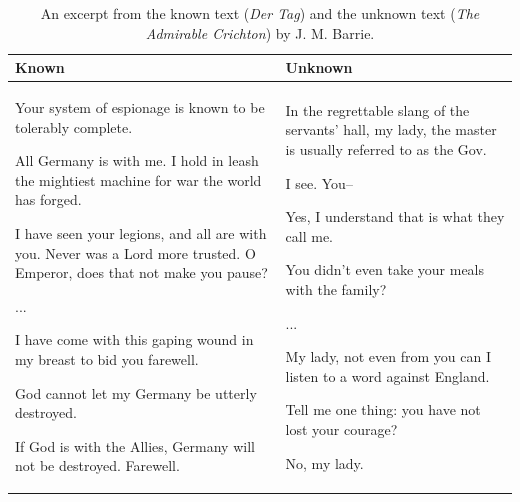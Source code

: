 \begin{table}[ht]
\fontsize{9}{11}\selectfont
\caption{\label{tab:barrietexts} An excerpt from the known text (\textit{Der Tag}) and the unknown text (\textit{The Admirable Crichton}) by J. M. Barrie.}
\begin{center}
\begin{tabular}{p{7cm} p{7cm}}
\toprule
\bf Known & \bf Unknown \\
\midrule
  
Your system of espionage is known to be tolerably complete.

All Germany is with me. I hold in leash the mightiest machine
for war the world has forged.

I have seen your legions, and all are with you. Never was a
Lord more trusted. O Emperor, does that not make you pause?

...

I have come with this gaping wound in my breast to bid you
farewell.

God cannot let my Germany be utterly destroyed.

If God is with the Allies, Germany will not be destroyed. Farewell.

& 
In the regrettable slang of the servants' hall, my lady, the
master is usually referred to as the Gov.

I see. You--

Yes, I understand that is what they call me.

You didn't even take your meals with
the family?

...

My lady, not even from you can I listen to a word against
England.

Tell me one thing: you have not lost your courage?

No, my lady. 
\\

\bottomrule
\end{tabular}
\end{center}
\end{table}


